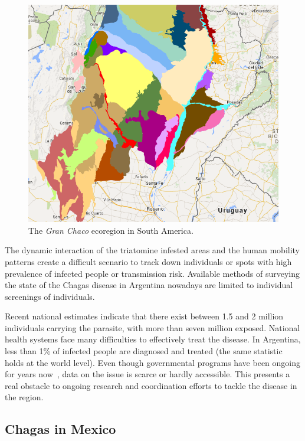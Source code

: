 \begin{figure}[h!]
\centering
\includegraphics[width=0.75\columnwidth]{figures/Ambientes_GranChaco_TNC-Argentina/Ambientes_GranChaco_TNC-Argentina.png}
\caption{The \textit{Gran Chaco} ecoregion in South America.%
}
\label{fig:granchaco}
\end{figure}


The dynamic interaction of the triatomine infested areas and the human mobility patterns create a difficult scenario to track down individuals or spots with high prevalence of infected people or transmission risk. Available methods of surveying the state of the Chagas disease in Argentina nowadays are limited to individual screenings of individuals. %

Recent national estimates indicate that there exist between 1.5 and 2 million individuals carrying the parasite, with more than seven million exposed. National health systems face many difficulties to effectively treat the disease.
In Argentina, less than 1\% of infected people are diagnosed and treated
(the same statistic holds at the world level).
Even though governmental programs have been ongoing for years now~\textcite{plan_nacional_chagas}, data on the issue is scarce or hardly accessible. This presents a real obstacle to ongoing research and coordination efforts to tackle the disease in the region.


\subsection{Chagas in  Mexico}\label{endemic_zone_mexico}


